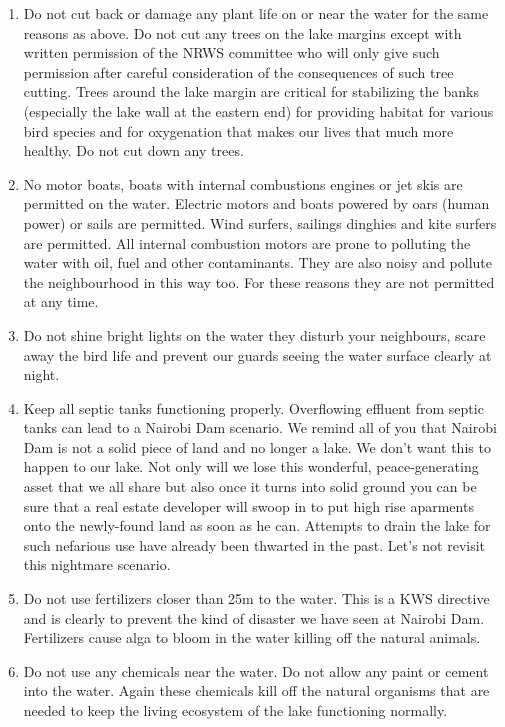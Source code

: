 \documentclass[a4paper,10pt, oneside]{letter}
\begin{document}
\begin{letter} {}
\begin{enumerate}
\item Do not cut back or damage any plant life on or near the water for the same reasons as above. Do not cut any trees on the lake margins except with written permission of the NRWS committee who will only give such permission after careful consideration of the consequences of such tree cutting. Trees around the lake margin are critical for stabilizing the banks (especially the lake wall at the eastern end) for providing habitat for various bird species and for oxygenation that makes our lives that much more healthy. Do not cut down any trees.

\item No motor boats, boats with internal combustions engines or jet skis are permitted on the water. Electric motors and boats powered by oars (human power) or sails are permitted. Wind surfers, sailings dinghies and kite surfers are permitted. All internal combustion motors are prone to polluting the water with oil, fuel and other contaminants. They are also noisy and pollute the neighbourhood in this way too. For these reasons they are not permitted at any time.

\item Do not shine bright lights on the water they disturb your neighbours, scare away the bird life and prevent our guards seeing the water surface clearly at night.

\item Keep all septic tanks functioning properly. Overflowing effluent from septic tanks can lead to a Nairobi Dam scenario. We remind all of you that Nairobi Dam is not a solid piece of land and no longer a lake. We don't want this to happen to our lake. Not only will we lose this wonderful, peace-generating asset that we all share but also once it turns into solid ground you can be sure that a real estate developer will swoop in to put high rise aparments onto the newly-found land as soon as he can. Attempts to drain the lake for such nefarious use have already been thwarted in the past. Let's not revisit this nightmare scenario.

\item Do not use fertilizers closer than 25m to the water. This is a KWS directive and is clearly to prevent the kind of disaster we have seen at Nairobi Dam. Fertilizers cause alga to bloom in the water killing off the natural animals.

\item Do not use any chemicals near the water. Do not allow any paint or cement into the water. Again these chemicals kill off the natural organisms that are needed to keep the living ecosystem of the lake functioning normally.


\end{enumerate}
\end{letter}
\end{document}
